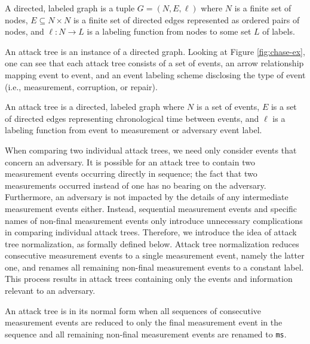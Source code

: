 \documentclass[runningheads]{llncs}
\theoremstyle{definition}
\begin{document}
\begin{definition}[Graph]
    A directed, labeled graph is a tuple $G = (N, E, \ell)$ where $N$ is a finite set of nodes, $E \subseteq N \times N$ is a finite set of directed edges represented as ordered pairs of nodes, and $\ell : N \rightarrow L$ is a labeling function from nodes to some set $L$ of labels. 
\end{definition}
 
An attack tree is an instance of a directed graph. Looking at Figure \ref{fig:chase-ex}, one can see that each attack tree consists of a set of events, an arrow relationship mapping event to event, and an event labeling scheme disclosing the type of event (i.e., measurement, corruption, or repair).

\begin{definition}
    An attack tree is a directed, labeled graph where $N$ is a set of events, $E$ is a set of directed edges representing chronological time between events, and $\ell$ is a labeling function from event to measurement or adversary event label.
\end{definition}

When comparing two individual attack trees, we need only consider events that concern an adversary. It is possible for an attack tree to contain two measurement events occurring directly in sequence; the fact that two measurements occurred instead of one has no bearing on the adversary. Furthermore, an adversary is not impacted by the details of any intermediate measurement events either. Instead, sequential measurement events and specific names of non-final measurement events only introduce unnecessary complications in comparing individual attack trees. Therefore, we introduce the idea of attack tree normalization, as formally defined below. Attack tree normalization reduces consecutive measurement events to a single measurement event, namely the latter one, and renames all remaining non-final measurement events to a constant label. This process results in attack trees containing only the events and information relevant to an adversary. 


\begin{definition}
    An attack tree is in its normal form when all sequences of consecutive measurement events are reduced to only the final measurement event in the sequence and all remaining non-final measurement events are renamed to \texttt{ms}. 
\end{definition}
\end{document}
